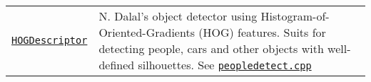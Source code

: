 \documentclass[10pt,landscape]{article}
\begin{document}
\begin{multicols}{3}
\begin{tabular}{@{}p{\the\MyLen}%
                @{}p{\linewidth-\the\MyLen}@{}}
\texttt{\href{http://opencv.willowgarage.com/documentation/cpp/objdetect__object_detection.html\#HOGDescriptor}{HOGDescriptor}} & N. Dalal's object detector using Histogram-of-Oriented-Gradients (HOG) features. Suits for detecting people, cars and other objects with well-defined silhouettes. See \texttt{\href{https://code.ros.org/svn/opencv/trunk/opencv/samples/cpp/peopledetect.cpp}{peopledetect.cpp}}\\

\end{tabular}

%    
%    
%        

\end{multicols}
\end{document}
